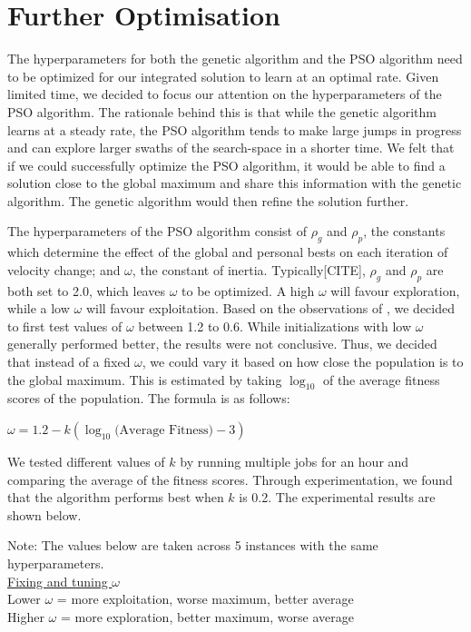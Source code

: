 \documentclass[12pt]{article}
\begin{document}
	\section{Further Optimisation}
	The hyperparameters for both the genetic algorithm and the PSO algorithm need
	to be optimized for our integrated solution to learn at an optimal rate.
	Given limited time, we decided to focus our attention on the hyperparameters
	of the PSO algorithm. The rationale behind this is that while the genetic
	algorithm learns at a steady rate, the PSO algorithm tends to make large jumps
	in progress and can explore larger swaths of the search-space in a shorter
	time. We felt that if we could successfully optimize the PSO algorithm, it would be able to
	find a solution close to the global maximum and share this information with the genetic algorithm.
	The genetic algorithm would then refine the solution further.

	The hyperparameters of the PSO algorithm consist of $\rho_g$ and $\rho_p$, the constants
	which determine the effect of the global and personal bests on each iteration
	of velocity change; and $\omega$, the constant of inertia. Typically[CITE], $\rho_g$ and $\rho_p$ are both
	set to 2.0, which leaves $\omega$ to be optimized. A high $\omega$ will favour exploration,
	while a low $\omega$ will favour exploitation. Based on the observations of \cite{shi1998parameter}, we decided to first test values of $\omega$ between 1.2 to 0.6.
	While initializations with low $\omega$ generally performed better, the results were
	not conclusive. Thus, we decided that instead of a fixed $\omega$, we could vary it
	based on how close the population is to the global maximum. This is estimated
	by taking $\log_{10}$ of the average fitness scores of the population. The formula is as follows:

	\begin{center}
		$\omega = 1.2 - k(\log_{10}\text{(Average Fitness)} - 3)$
	\end{center}

	We tested different values of $k$ by running multiple jobs for an hour and comparing
 	the average of the fitness scores. Through experimentation, we found that the
	algorithm performs best when $k$ is 0.2. The experimental results are shown below.

	Note: The values below are taken across 5 instances with the same hyperparameters.\\

	\underline{Fixing and tuning $\omega$}\\
	Lower $\omega$ = more exploitation, worse maximum, better average\\
	Higher $\omega$ = more exploration, better maximum, worse average\\
\end{document}
